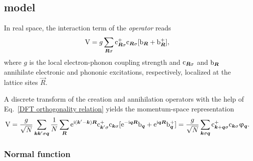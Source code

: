 \subsection{ model}
\label{Holstein model}

In real space, the interaction term of the \emph{
operator} reads \cite{vonderLindenBergerValasek95}
%
\begin{equation*}
    \mathrm V = g \sum_{\boldsymbol R \sigma}
    \mathrm c_{\boldsymbol R \sigma}^+ \mathrm c_{\boldsymbol R \sigma}
    [\mathrm b_{\boldsymbol R} + \mathrm b_{\boldsymbol R}^+],
\end{equation*}
%
where $g$ is the local electron-phonon coupling strength and $\mathrm c_{\boldsymbol R
\sigma}$ and $\mathrm b_{\boldsymbol R}$ annihilate electronic and phononic excitations,
respectively, localized at the lattice sites $\vec R$.

A discrete  transform of the creation and annihilation operators
with the help of Eq.~\ref{DFT orthogonality relation} yields the momentum-space
representation
%
\begin{equation*}
    \mathrm V = \frac g {\sqrt N} \sum_{\boldsymbol k \boldsymbol k' \sigma \boldsymbol q}
    \frac 1 N \sum_{\boldsymbol R} \mathrm e^{\mathrm i (\boldsymbol k' - \boldsymbol k) \boldsymbol R}
    \mathrm c_{\boldsymbol k' \sigma}^+ \mathrm c_{\boldsymbol k \sigma} [
        \mathrm e^{-\mathrm i \boldsymbol q \boldsymbol R} \mathrm b_{\boldsymbol q} +
        \mathrm e^{\mathrm i \boldsymbol q \boldsymbol R} \mathrm b_{\boldsymbol q}^+
        ]
    = \frac g {\sqrt N} \sum_{\boldsymbol k \sigma \boldsymbol q}
    \mathrm c_{\boldsymbol k + \boldsymbol q \sigma}^+ \mathrm c_{\boldsymbol k \sigma}
    \upvarphi_{\boldsymbol q}.
\end{equation*}

\subsubsection{Normal  function}

